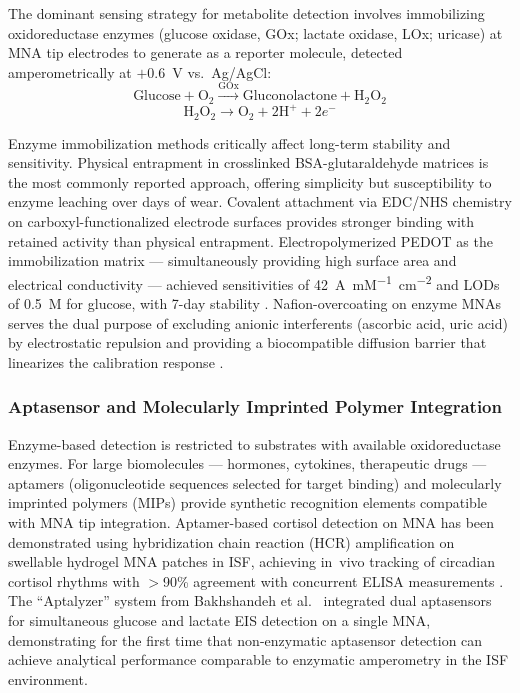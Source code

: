 \documentclass[review,1p]{elsarticle}
\begin{document}
The dominant sensing strategy for metabolite detection involves immobilizing oxidoreductase enzymes (glucose oxidase, GOx; lactate oxidase, LOx; uricase) at MNA tip electrodes to generate  as a reporter molecule, detected amperometrically at $+0.6$~V vs.~Ag/AgCl:
\begin{equation}
\text{Glucose} + \text{O}_2 \xrightarrow{\text{GOx}} \text{Gluconolactone} + \text{H}_2\text{O}_2
\label{eq:gox}
\end{equation}
\begin{equation}
\text{H}_2\text{O}_2 \rightarrow \text{O}_2 + 2\text{H}^+ + 2e^-
\label{eq:h2o2}
\end{equation}

Enzyme immobilization methods critically affect long-term stability and sensitivity. Physical entrapment in crosslinked BSA-glutaraldehyde matrices is the most commonly reported approach, offering simplicity but susceptibility to enzyme leaching over days of wear. Covalent attachment via EDC/NHS chemistry on carboxyl-functionalized electrode surfaces provides stronger binding with retained activity than physical entrapment. Electropolymerized PEDOT as the immobilization matrix — simultaneously providing high surface area and electrical conductivity — achieved sensitivities of 42~\textmu{}A~mM\textsuperscript{$-1$}~cm\textsuperscript{$-2$} and LODs of 0.5~\textmu{}M for glucose, with 7-day stability \cite{Sharma2022AFE}. Nafion-overcoating on enzyme MNAs serves the dual purpose of excluding anionic interferents (ascorbic acid, uric acid) by electrostatic repulsion and providing a biocompatible diffusion barrier that linearizes the calibration response \cite{Mohan2021}.

\subsubsection{Aptasensor and Molecularly Imprinted Polymer Integration}

Enzyme-based detection is restricted to substrates with available oxidoreductase enzymes. For large biomolecules — hormones, cytokines, therapeutic drugs — aptamers (oligonucleotide sequences selected for target binding) and molecularly imprinted polymers (MIPs) provide synthetic recognition elements compatible with MNA tip integration. Aptamer-based cortisol detection on MNA has been demonstrated using hybridization chain reaction (HCR) amplification on swellable hydrogel MNA patches in ISF, achieving in~vivo tracking of circadian cortisol rhythms with $>$90\% agreement with concurrent ELISA measurements \cite{Zhou2025Cortisol}. The ``Aptalyzer'' system from Bakhshandeh et al.\ \cite{Bakhshandeh2024} integrated dual aptasensors for simultaneous glucose and lactate EIS detection on a single MNA, demonstrating for the first time that non-enzymatic aptasensor detection can achieve analytical performance comparable to enzymatic amperometry in the ISF environment.
\end{document}
